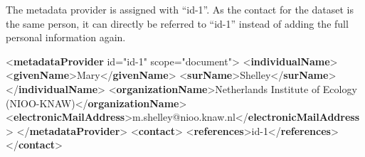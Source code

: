 \documentclass[
]{book}
\newenvironment{Shaded}{\begin{snugshade}}{\end{snugshade}}
\newcommand{\KeywordTok}[1]{\textcolor[rgb]{0.13,0.29,0.53}{\textbf{#1}}}
\newcommand{\NormalTok}[1]{#1}
\newcommand{\OtherTok}[1]{\textcolor[rgb]{0.56,0.35,0.01}{#1}}
\newcommand{\StringTok}[1]{\textcolor[rgb]{0.31,0.60,0.02}{#1}}
\begin{document}
The metadata provider is assigned with ``id-1''. As the contact for the dataset is the same person, it can directly be referred to ``id-1'' instead of adding the full personal information again.

\begin{Shaded}
\begin{Highlighting}[]
\NormalTok{\textless{}}\KeywordTok{metadataProvider}\OtherTok{ id=}\StringTok{"id{-}1"}\OtherTok{ scope=}\StringTok{"document"}\NormalTok{\textgreater{}}
\NormalTok{  \textless{}}\KeywordTok{individualName}\NormalTok{\textgreater{}}
\NormalTok{    \textless{}}\KeywordTok{givenName}\NormalTok{\textgreater{}Mary\textless{}/}\KeywordTok{givenName}\NormalTok{\textgreater{}}
\NormalTok{    \textless{}}\KeywordTok{surName}\NormalTok{\textgreater{}Shelley\textless{}/}\KeywordTok{surName}\NormalTok{\textgreater{}}
\NormalTok{  \textless{}/}\KeywordTok{individualName}\NormalTok{\textgreater{}}
\NormalTok{  \textless{}}\KeywordTok{organizationName}\NormalTok{\textgreater{}Netherlands Institute of Ecology (NIOO{-}KNAW)\textless{}/}\KeywordTok{organizationName}\NormalTok{\textgreater{}}
\NormalTok{  \textless{}}\KeywordTok{electronicMailAddress}\NormalTok{\textgreater{}m.shelley@nioo.knaw.nl\textless{}/}\KeywordTok{electronicMailAddress}\NormalTok{\textgreater{}}
\NormalTok{\textless{}/}\KeywordTok{metadataProvider}\NormalTok{\textgreater{}}
\NormalTok{\textless{}}\KeywordTok{contact}\NormalTok{\textgreater{}}
\NormalTok{  \textless{}}\KeywordTok{references}\NormalTok{\textgreater{}id{-}1\textless{}/}\KeywordTok{references}\NormalTok{\textgreater{}}
\NormalTok{\textless{}/}\KeywordTok{contact}\NormalTok{\textgreater{}}
\end{Highlighting}
\end{Shaded}
\end{document}
